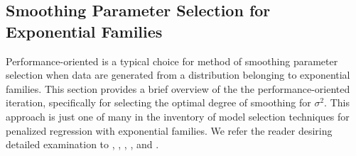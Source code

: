 
\subsection{Smoothing Parameter Selection for Exponential Families} \label{smoothing-parameter-selection-exponential-families}
Performance-oriented is a typical choice for method of smoothing parameter selection when data are generated from a distribution belonging to exponential families. This section provides a brief overview of the the performance-oriented iteration, specifically for selecting the optimal degree of smoothing for $\sigma^2$. This approach is just one of many in the inventory of model selection techniques for penalized regression with exponential families. We refer the reader desiring detailed examination to \cite{zhang2006component}, \cite{xiang1996generalized}, \cite{wahba1995smoothing},  \cite{wood2004stable}, and \cite{wood2017generalized}. 

\bigskip


